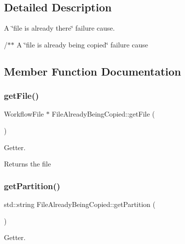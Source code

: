 \subsection{Detailed Description}
A \char`\"{}file is already there\char`\"{} failure cause. 

/$\ast$$\ast$ A \char`\"{}file is already being copied\char`\"{} failure cause 

\subsection{Member Function Documentation}
\mbox{\label{class_file_already_being_copied_a8c6056a114a9dced95b3d18279fd84b7}} 
\subsubsection{\texorpdfstring{get\+File()}{getFile()}}
{\footnotesize\ttfamily Workflow\+File $\ast$ File\+Already\+Being\+Copied\+::get\+File (\begin{DoxyParamCaption}{ }\end{DoxyParamCaption})}



Getter. 

\begin{DoxyReturn}{Returns}
the file 
\end{DoxyReturn}
\mbox{\label{class_file_already_being_copied_ab0edc31e09650460c6a04b5ea9e656ac}} 
\subsubsection{\texorpdfstring{get\+Partition()}{getPartition()}}
{\footnotesize\ttfamily std\+::string File\+Already\+Being\+Copied\+::get\+Partition (\begin{DoxyParamCaption}{ }\end{DoxyParamCaption})}



Getter. 

